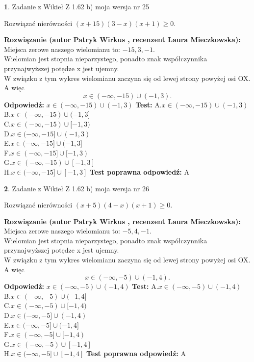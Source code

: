 \documentclass[12pt, a4paper]{article}
\theoremstyle{definition} %
\newtheorem{zad}{}
\newcommand{\zadStart}[1]{\begin{zad}#1\newline}
\newcommand{\zadStop}{\end{zad}}
\newcommand{\rozwStart}[2]{\noindent \textbf{Rozwiązanie (autor #1 , recenzent #2): }\newline}
\newcommand{\rozwStop}{\newline}
\newcommand{\odpStart}{\noindent \textbf{Odpowiedź:}\newline}
\newcommand{\odpStop}{\newline}
\newcommand{\testStart}{\noindent \textbf{Test:}\newline}
\newcommand{\testStop}{\newline}
\newcommand{\kluczStart}{\noindent \textbf{Test poprawna odpowiedź:}\newline}
\newcommand{\kluczStop}{\newline}
\begin{document}
\zadStart{Zadanie z Wikieł Z 1.62 b) moja wersja nr 25}

Rozwiązać nierówności $(x+15)(3-x)(x+1)\ge0$.
\zadStop
\rozwStart{Patryk Wirkus}{Laura Mieczkowska}
Miejsca zerowe naszego wielomianu to: $-15, 3, -1$.\\
Wielomian jest stopnia nieparzystego, ponadto znak współczynnika przy\linebreak najwyższej potędze x jest ujemny.\\ W związku z tym wykres wielomianu zaczyna się od lewej strony powyżej osi OX. A więc $$x \in (-\infty,-15) \cup (-1,3).$$
\rozwStop
\odpStart
$x \in (-\infty,-15) \cup (-1,3)$
\odpStop
\testStart
A.$x \in (-\infty,-15) \cup (-1,3)$\\
B.$x \in (-\infty,-15) \cup (-1,3]$\\
C.$x \in (-\infty,-15) \cup [-1,3)$\\
D.$x \in (-\infty,-15] \cup (-1,3)$\\
E.$x \in (-\infty,-15] \cup (-1,3]$\\
F.$x \in (-\infty,-15] \cup [-1,3)$\\
G.$x \in (-\infty,-15) \cup [-1,3]$\\
H.$x \in (-\infty,-15] \cup [-1,3]$
\testStop
\kluczStart
A
\kluczStop



\zadStart{Zadanie z Wikieł Z 1.62 b) moja wersja nr 26}

Rozwiązać nierówności $(x+5)(4-x)(x+1)\ge0$.
\zadStop
\rozwStart{Patryk Wirkus}{Laura Mieczkowska}
Miejsca zerowe naszego wielomianu to: $-5, 4, -1$.\\
Wielomian jest stopnia nieparzystego, ponadto znak współczynnika przy\linebreak najwyższej potędze x jest ujemny.\\ W związku z tym wykres wielomianu zaczyna się od lewej strony powyżej osi OX. A więc $$x \in (-\infty,-5) \cup (-1,4).$$
\rozwStop
\odpStart
$x \in (-\infty,-5) \cup (-1,4)$
\odpStop
\testStart
A.$x \in (-\infty,-5) \cup (-1,4)$\\
B.$x \in (-\infty,-5) \cup (-1,4]$\\
C.$x \in (-\infty,-5) \cup [-1,4)$\\
D.$x \in (-\infty,-5] \cup (-1,4)$\\
E.$x \in (-\infty,-5] \cup (-1,4]$\\
F.$x \in (-\infty,-5] \cup [-1,4)$\\
G.$x \in (-\infty,-5) \cup [-1,4]$\\
H.$x \in (-\infty,-5] \cup [-1,4]$
\testStop
\kluczStart
A
\kluczStop
\end{document}
